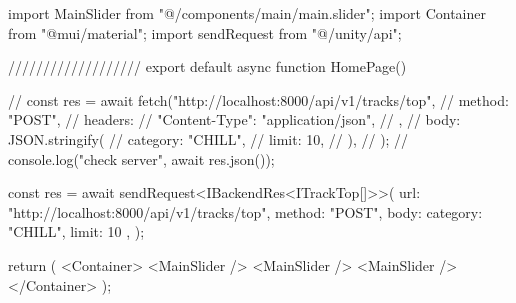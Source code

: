 import MainSlider from "@/components/main/main.slider";
import { Container } from "@mui/material";
import { sendRequest } from "@/unity/api";

///////////////////
export default async function HomePage() {
  // const res = await fetch("http://localhost:8000/api/v1/tracks/top", {
  //   method: "POST",
  //   headers: {
  //     "Content-Type": "application/json",
  //   },
  //   body: JSON.stringify({
  //     category: "CHILL",
  //     limit: 10,
  //   }),
  // });
  // console.log("check server", await res.json());

  

  const res = await sendRequest<IBackendRes<ITrackTop[]>>({
    url: "http://localhost:8000/api/v1/tracks/top",
    method: "POST",
    body: { category: "CHILL", limit: 10 },
  });

  return (
    <Container>
      <MainSlider />
      <MainSlider />
      <MainSlider />
    </Container>
  );
}
